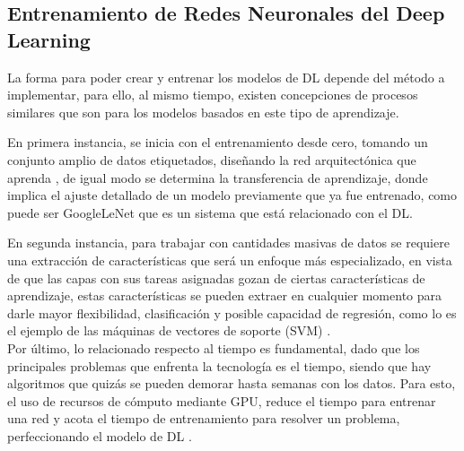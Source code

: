 \subsection{Entrenamiento de Redes Neuronales del Deep Learning}
La forma para poder crear y entrenar los modelos de DL depende del método a implementar, para ello, al mismo tiempo, existen concepciones de procesos similares que son para los modelos basados en este tipo de aprendizaje.\\
\par En primera instancia, se inicia con el entrenamiento desde cero, tomando un conjunto amplio de datos etiquetados, diseñando la red arquitectónica que aprenda \cite{Pang2017}, de igual modo se determina la transferencia de aprendizaje, donde implica el ajuste detallado de un modelo previamente que ya fue entrenado, como puede ser GoogleLeNet que es un sistema que está relacionado con el DL. \\
\par En segunda instancia, para trabajar con cantidades masivas de datos se requiere una extracción de características que será un enfoque más especializado, en vista de que las capas con sus tareas asignadas gozan de ciertas características de aprendizaje, estas características se pueden extraer en cualquier momento para darle mayor flexibilidad, clasificación y posible capacidad de regresión, como lo es el ejemplo de las máquinas de vectores de soporte (SVM) \cite{Dong2018}.\\
Por último, lo relacionado respecto al tiempo es fundamental, dado que los principales problemas que enfrenta la tecnología es el tiempo, siendo que hay algoritmos que quizás se pueden demorar hasta semanas con los datos. Para esto, el uso de recursos de cómputo mediante GPU, reduce el tiempo para entrenar una red y acota el tiempo de entrenamiento para resolver un problema, perfeccionando el modelo de DL \cite{Pang2017}.\\

\doublespacing
